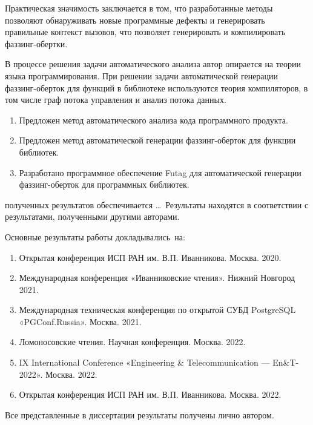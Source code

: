 {\influence} Практическая значимость заключается в том, что разработанные методы позволяют обнаруживать новые программные дефекты и генерировать правильные контекст вызовов, что позволяет генерировать  и компилировать фаззинг-обертки.

{\methods} В процессе решения задачи автоматического анализа автор опирается на теории языка программирования. При решении задачи автоматической генерации фаззинг-оберток для функций в библиотеке используются теория компиляторов, в том числе граф потока управления и анализ потока данных.

{}
\begin{enumerate}[beginpenalty=10000] %
  \item Предложен метод автоматического анализа кода программного продукта.
  \item Предложен метод автоматической генерации фаззинг-оберток для функции библиотек.
  \item Разработано программное обеспечение Futag для автоматической генерации фаззинг-оберток для программных библиотек.
\end{enumerate}

{\reliability} полученных результатов обеспечивается \ldots \ Результаты находятся в соответствии с результатами, полученными другими авторами.

{\probation}
Основные результаты работы докладывались~на:
\begin{enumerate}[beginpenalty=10000] %
  \item Открытая конференция ИСП РАН им. В.П. Иванникова. Москва. 2020.
  \item Международная конференция «Иванниковские чтения». Нижний Новгород 2021.
  \item Международная техническая конференция по открытой СУБД PostgreSQL «PGConf.Russia». Москва. 2021.
  \item Ломоносовские чтения. Научная конференция. Москва. 2022.
  \item IX International Conference «Engineering \& Telecommunication — En\&T-2022». Москва. 2022.
  \item Открытая конференция ИСП РАН им. В.П. Иванникова. Москва. 2022.
\end{enumerate}

{\contribution} Все представленные в диссертации результаты получены лично автором.

